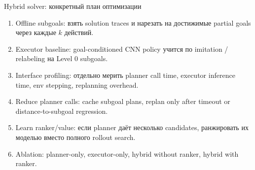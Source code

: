 \documentclass[aspectratio=169]{beamer}
\begin{document}
\begin{frame}{Hybrid solver: конкретный план оптимизации}
  \small
  \begin{enumerate}
    \item Offline subgoals: взять solution traces и нарезать на достижимые partial goals через каждые \(k\) действий.
    \item Executor baseline: goal-conditioned CNN policy учится по imitation / relabeling на Level 0 subgoals.
    \item Interface profiling: отдельно мерить planner call time, executor inference time, env stepping, replanning overhead.
    \item Reduce planner calls: cache subgoal plans, replan only after timeout or distance-to-subgoal regression.
    \item Learn ranker/value: если planner даёт несколько candidates, ранжировать их моделью вместо полного rollout search.
    \item Ablation: planner-only, executor-only, hybrid without ranker, hybrid with ranker.
  \end{enumerate}
\end{frame}
\end{document}
